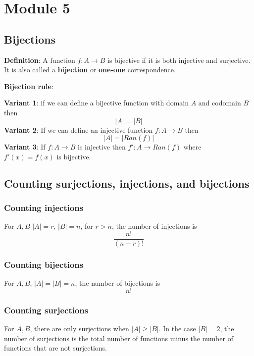 \chapter{Module 5}


\section{Bijections}

\begin{framed}
   \textbf{Definition}: A function $f: A \rightarrow B$ is bijective if it is both injective and surjective. It is also called a \textbf{bijection} or \textbf{one-one} correspondence. 
\end{framed}

\begin{framed}
   \textbf{Bijection rule}: 

   \textbf{Variant 1}: if we can define a bijective function with domain $A$ and codomain $B$ then
   \[
     |A| = |B|
   \] 
   \textbf{Variant 2}: If we cna define an injective function $f: A \rightarrow B$ then
   \[
     |A| = |Ran(f)|
   \] 
   \textbf{Variant 3}: If $f: A \rightarrow B$ is injective then $f': A \rightarrow Ran(f)$ where $f'(x) = f(x)$ is bijective.
\end{framed}


\section{Counting surjections, injections, and bijections}

\subsection{Counting injections}
For $A, B$ $|A| = r$, $|B| = n$, for  $r > n$, the number of injections is
 \[
  \frac{n!}{(n-r)!}
\] 

\subsection{Counting bijections}

For $A, B$, $|A|  = |B| = n$, the number of bijections is
 \[
  n!
\] 

\subsection{Counting surjections}

For $A, B$, there are only surjections when $|A| \geq |B|$. In the case $|B| = 2$, the number of surjections is the total number of functions minus the number of functions that are not surjections. \\

